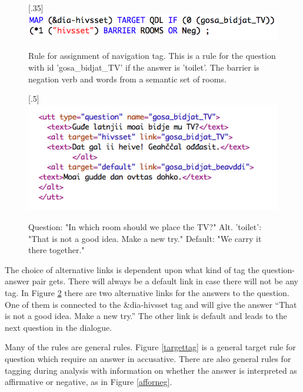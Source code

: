 \documentclass[11pt]{article}
\begin{document}
\begin{figure}[htbp]
\begin{center}
\scalebox{.35}[.35]{\includegraphics{presentation/img/hivsset_tag.png}}\\
\caption{Rule for assignment of navigation tag. This is a rule for the question with id 'gosa\_bidjat\_TV' if the answer is 'toilet'. The barrier is negation verb and words from a semantic set of rooms.}
\label{hivssettag}
\end{center}
\end{figure}



\begin{figure}[htbp]
\begin{center}
\scalebox{.5}[.5]{\includegraphics{presentation/img/gosabidjatTV.png}}\\
\caption{Question: "In which room should we place the TV?"
Alt. 'toilet': "That is not a good idea. Make a new try." 
Default: "We carry it there together." 
}
\label{altlinks}
\end{center}
\end{figure}

The choice of alternative links is dependent upon what kind of tag the question-answer pair gets. There will always be a default link in case there will not be any tag. In Figure \ref{altlinks} there are two alternative links for the answers to the question. One of them is connected to the \&dia-hivsset tag and will give the answer “That is not a good idea. Make a new try.” The other link is default and leads to the next question in the dialogue. 

Many of the rules are general rules. Figure \ref{targettag} is a general target rule for question which require an answer in accusative. There are also general rules for tagging during analysis with information on whether the answer is interpreted as affirmative or negative, as in Figure \ref{afforneg}.
 
\end{document}
